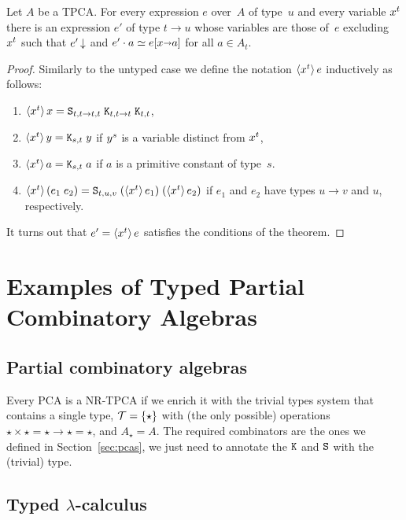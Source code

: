 \begin{theorem}
  Let $A$ be a TPCA. For every expression $e$ over~$A$ of type~$u$ and
  every variable $x^{t}$ there is an expression $e'$ of type $t
  \to u$ whose variables are those of~$e$ excluding~$x^{t}$
  such that $e'\,{\downarrow}$ and $e' \cdot a \simeq e[x {\shortrightarrow}
    a]$ for all $a \in A_t$.
\end{theorem}

\begin{proof}
  Similarly to the untyped case we define the notation
  $\langle x^{t} \rangle\,e$ inductively as follows:
  \begin{enumerate}
  \item $\langle x^{t} \rangle\,x = \mathtt{S}_{t,t \to t,t} \; \mathtt{K}_{t,t \to
      t} \; \mathtt{K}_{t,t}$,
  \item $\langle x^{t} \rangle\,y = \mathtt{K}_{s,t}\; y$ if $y^{s}$ is a
    variable distinct from $x^{t}$,
  \item $\langle x^{t} \rangle\,a = \mathtt{K}_{s,t} \; a$ if $a$ is a primitive
    constant of type~$s$.
  \item $\langle x^{t} \rangle\,(e_1\; e_2) = \mathtt{S}_{t,u,v}\;
    (\langle x^{t} \rangle\,e_1) \; (\langle x^{t} \rangle\,e_2)$ if $e_1$ and
    $e_2$ have types $u \to v$ and $u$, respectively.
  \end{enumerate}
  It turns out that $e' = \langle x^{t} \rangle\,e$ satisfies the conditions
  of the theorem.
\end{proof}

\section{Examples of Typed Partial Combinatory Algebras}
\label{sec:examples-tpcas}

\subsection{Partial combinatory algebras}

Every PCA is a NR-TPCA if we enrich it with the trivial types system
that contains a single type, $\mathcal{T} = \{\star\}$ with (the
only possible) operations $\star \times \star = \star \to \star =
\star$, and $A_\star = A$. The required combinators are the ones we
defined in Section~\ref{sec:pcas}, we just need to annotate the
$\mathtt{K}$ and $\mathtt{S}$ with the (trivial) type.


\subsection[\texorpdfstring%
{Typed $\lambda$-calculus}%
{Typed lambda-calculus}%
]{Typed $\lambda$-calculus}
\label{sec:typed-lambda-calculus}

